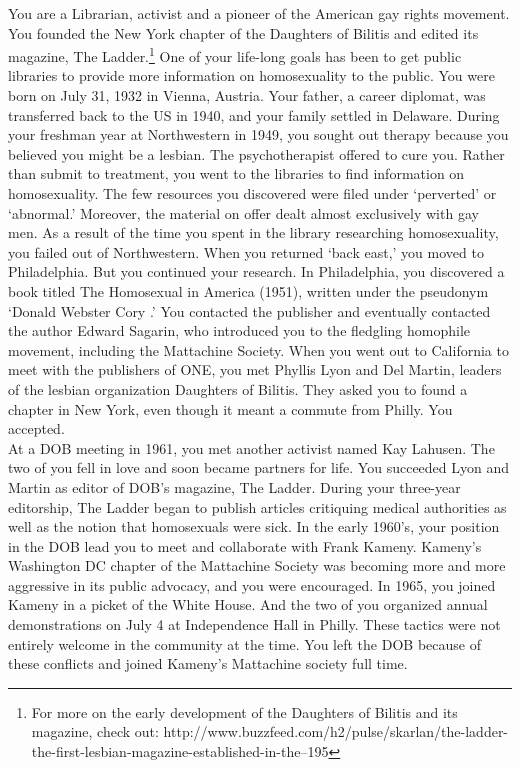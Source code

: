 \begin{refsection}
You are a Librarian, activist and a pioneer of the American gay rights movement. You founded the New York chapter of the Daughters of Bilitis and edited its magazine, The Ladder.\footnote{For more on the early development of the Daughters of Bilitis and its magazine, check out: http:\slash \slash www.buzzfeed.com\slash h2\slash pulse\slash skarlan\slash the-ladder-the-first-lesbian-magazine-established-in-the--195} One of your life-long goals has been to get public libraries to provide more information on homosexuality to the public.
You were born on July 31, 1932 in Vienna, Austria. Your father, a career diplomat, was transferred back to the US in 1940, and your family settled in Delaware.
During your freshman year at Northwestern in 1949, you sought out therapy because you believed you might be a lesbian. The psychotherapist offered to cure you. Rather than submit to treatment, you went to the libraries to find information on homosexuality. The few resources you discovered were filed under `perverted' or `abnormal.' Moreover, the material on offer dealt almost exclusively with gay men.
As a result of the time you spent in the library researching homosexuality, you failed out of Northwestern. When you returned `back east,' you moved to Philadelphia.
But you continued your research. In Philadelphia, you discovered a book titled The Homosexual in America (1951), written under the pseudonym `Donald Webster Cory .' You contacted the publisher and eventually contacted the author Edward Sagarin, who introduced you to the fledgling homophile movement, including the Mattachine Society.
When you went out to California to meet with the publishers of ONE, you met Phyllis Lyon and Del Martin, leaders of the lesbian organization Daughters of Bilitis. They asked you to found a chapter in New York, even though it meant a commute from Philly. You accepted.\\
At a DOB meeting in 1961, you met another activist named Kay Lahusen. The two of you fell in love and soon became partners for life.
You succeeded Lyon and Martin as editor of DOB's magazine, The Ladder. During your three-year editorship, The Ladder began to publish articles critiquing medical authorities as well as the notion that homosexuals were sick.
In the early 1960's, your position in the DOB lead you to meet and collaborate with Frank Kameny. Kameny's Washington DC chapter of the Mattachine Society was becoming more and more aggressive in its public advocacy, and you were encouraged. In 1965, you joined Kameny in a picket of the White House. And the two of you organized annual demonstrations on July 4 at Independence Hall in Philly.
These tactics were not entirely welcome in the community at the time. You left the DOB because of these conflicts and joined Kameny's Mattachine society full time.


\end{refsection}
